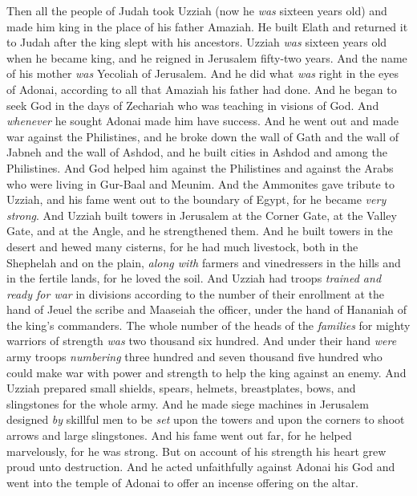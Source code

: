 \begin{biblechapter} %
 Then all the people of Judah took Uzziah (now he \textit{was} sixteen years old) and made him king in the place of his father Amaziah.
\verse He built Elath and returned it to Judah after the king slept with his ancestors.
\verse Uzziah \textit{was} sixteen years old when he became king, and he reigned in Jerusalem fifty-two years. And the name of his mother \textit{was} Yecoliah of Jerusalem.
\verse And he did what \textit{was} right in the eyes of Adonai, according to all that Amaziah his father had done.
\verse And he began to seek God in the days of Zechariah who was teaching in visions of God. And \textit{whenever} he sought Adonai made him have success.
\verse And he went out and made war against the Philistines, and he broke down the wall of Gath and the wall of Jabneh and the wall of Ashdod, and he built cities in Ashdod and among the Philistines.
\verse And God helped him against the Philistines and against the Arabs who were living in Gur-Baal and Meunim.
\verse And the Ammonites gave tribute to Uzziah, and his fame went out to the boundary of Egypt, for he became \textit{very strong}.
\verse And Uzziah built towers in Jerusalem at the Corner Gate, at the Valley Gate, and at the Angle, and he strengthened them.
\verse And he built towers in the desert and hewed many cisterns, for he had much livestock, both in the Shephelah and on the plain, \textit{along with} farmers and vinedressers in the hills and in the fertile lands, for he loved the soil.
\verse And Uzziah had troops \textit{trained and ready for war} in divisions according to the number of their enrollment at the hand of Jeuel the scribe and Maaseiah the officer, under the hand of Hananiah of the king’s commanders.
\verse The whole number of the heads of the \textit{families} for mighty warriors of strength \textit{was} two thousand six hundred.
\verse And under their hand \textit{were} army troops \textit{numbering} three hundred and seven thousand five hundred who could make war with power and strength to help the king against an enemy.
\verse And Uzziah prepared small shields, spears, helmets, breastplates, bows, and slingstones for the whole army.
\verse And he made siege machines in Jerusalem designed \textit{by} skillful men to be \textit{set} upon the towers and upon the corners to shoot arrows and large slingstones. And his fame went out far, for he helped marvelously, for he was strong.
\verse But on account of his strength his heart grew proud unto destruction. And he acted unfaithfully against Adonai his God and went into the temple of Adonai to offer an incense offering on the altar.

\end{biblechapter}
